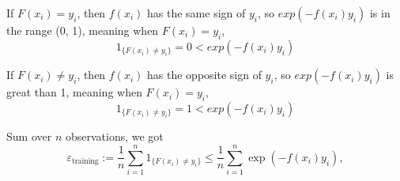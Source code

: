 \begin{answer}

If $F(x_i) = y_i$, then $f(x_i)$ has the same sign of $y_i$, so $exp(-f(x_i) y_i)$ is in the range (0, 1), meaning when $F(x_i) = y_i$, 
\begin{equation}
		1_{\{F(x_i) \neq y_i\}} = 0 <  exp(-f(x_i) y_i)
\end{equation}

If $F(x_i) \ne y_i$, then $f(x_i)$ has the opposite sign of $y_i$, so $exp(-f(x_i) y_i)$ is great than 1, meaning when $F(x_i) = y_i$, 
\begin{equation}
		1_{\{F(x_i) \neq y_i\}} = 1 <  exp(-f(x_i) y_i)
\end{equation}

Sum over $n$ observations, we got 
\begin{equation}
    \varepsilon_{\text{training}}
		:= \frac{1}{n} \sum_{i=1}^n 1_{\{F(x_i) \neq y_i\}}
		\le \frac{1}{n} \sum_{i=1}^n \exp(-f(x_i) y_i),
\end{equation}
\end{answer}